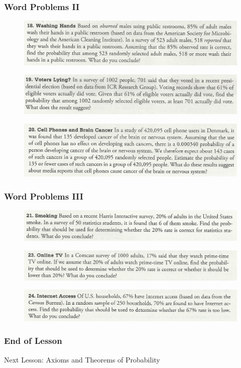 \documentclass[xcolor=dvipsnames]{beamer}
\begin{document}
\begin{frame}
  \frametitle{Word Problems II}
  \begin{figure}[h]
    \includegraphics[scale=.7]{./diagrams/triola1.png}
  \end{figure}
  \begin{figure}[h]
    \includegraphics[scale=.7]{./diagrams/triola2.png}
  \end{figure}
  \begin{figure}[h]
    \includegraphics[scale=.7]{./diagrams/triola3.png}
  \end{figure}
\end{frame}

\begin{frame}
  \frametitle{Word Problems III}
  \begin{figure}[h]
    \includegraphics[scale=.7]{./diagrams/triola4.png}
  \end{figure}
  \begin{figure}[h]
    \includegraphics[scale=.7]{./diagrams/triola5.png}
  \end{figure}
  \begin{figure}[h]
    \includegraphics[scale=.7]{./diagrams/triola6.png}
  \end{figure}
\end{frame}

\begin{frame}
  \frametitle{End of Lesson}
Next Lesson: Axioms and Theorems of Probability
\end{frame}
\end{document}
